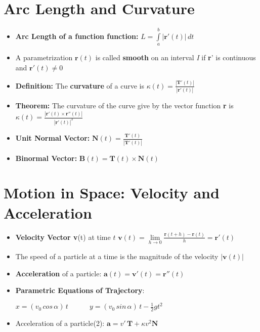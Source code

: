 \documentclass{report}
\begin{document}
	\section{Arc Length and Curvature}
		\begin{itemize}\addtolength{\leftskip}{2em}
			\item \textbf{Arc Length of a function function:}
				\subitem $L=\int\limits_{a}^{b}|\textbf{r}'(t)|\,dt$
			\item A parametrization $\textbf{r}(t)$ is called \textbf{smooth} on an interval \textit{I} if \textbf{r}' is continuous and $\textbf{r}'(t) \ne 0$
			\item \textbf{Definition:} The \textbf{curvature} of a curve is
				\subitem \Large $\kappa (t)=\frac{|\textbf{T}'(t)|}{|\textbf{r}'(t)|}$
			\large\item \textbf{Theorem:} The curvature of the curve give by the vector function \textbf{r} is 
				\subitem \Large$\kappa (t)=\frac{|\textbf{r}'(t)\times \textbf{r}''(t)|}{|\textbf{r}'(t)|^3}$
			\large\item \textbf{Unit Normal Vector:}
				\subitem \Large $\textbf{N}(t)=\frac{\textbf{T}'(t)}{|\textbf{T}'(t)|}$
			\large\item \textbf{Binormal Vector:}
				\subitem \Large $\textbf{B}(t)=\textbf{T}(t)\times \textbf{N}(t)$
		\end{itemize}
	\section{Motion in Space: Velocity and Acceleration}
		\begin{itemize}\addtolength{\leftskip}{2em}
			\item \textbf{Velocity Vector v}(t) at time $t$
				\Large\subitem $\textbf{v}(t)=\lim\limits_{h\rightarrow 0}\frac{\textbf{r}(t+h)-\textbf{r}(t)}{h}=\textbf{r}'(t)$
				\large\item The speed of a particle at a time is the magnitude of the velocity $|\textbf{v}(t)|$
				\item\textbf{Acceleration} of a particle: \Large$\textbf{a}(t)=\textbf{v}'(t)=\textbf{r}''(t)$
				\large\item \textbf{Parametric Equations of Trajectory}: 
					\begin{center}
					 \Large$x=(v_0 \,cos\,\alpha)\,t\quad\quad\quad y=(v_0 \,sin\,\alpha)\,t-\frac{1}{2}gt^2$
					\end{center}
				\large\item Acceleration of a particle(2): \Large$\textbf{a}=v'\,\textbf{T}+\kappa v^2\textbf{N}$
		\end{itemize}
\end{document}
